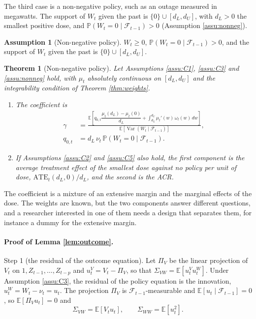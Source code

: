 \documentclass[12pt,a4paper]{article}
\newtheorem{thm}{Theorem}
\theoremstyle{definition}
\newtheorem{assumption}{Assumption}
\newcommand{\E}{\mathbb{E}}
\newcommand{\var}{\operatorname{Var}}
\begin{document}
The third case is a non-negative policy, such as an outage measured in megawatts. The support of $W_t$ given the past is $\{0\}\cup[d_L,d_U]$, with $d_L>0$ the smallest positive dose, and $\mathbb{P}(W_t=0\mid\mathcal{F}_{t-1})>0$ (Assumption \ref{assu:nonneg}).

\begin{assumption}[Non-negative policy\label{assu:nonneg}]
$W_t\geq0$, $\mathbb{P}(W_t=0\mid\mathcal{F}_{t-1})>0$, and the support of $W_t$ given the past is $\{0\}\cup[d_L,d_U]$.
\end{assumption}

\begin{thm}[Non-negative policy\label{thm:nonneg}]
Let Assumptions \ref{assu:C1}, \ref{assu:C3} and \ref{assu:nonneg} hold, with $\mu_t$ absolutely continuous on $[d_L,d_U]$ and the integrability condition of Theorem \ref{thm:weights}.
\begin{enumerate}
\item[(a)] The coefficient is
\begin{equation}
\begin{aligned}
\gamma&=\frac{\E\left[q_{0,t}\dfrac{\mu_t(d_L)-\mu_t(0)}{d_L}+\displaystyle\int_{d_L}^{d_U}\mu_t'(w)\,\omega_t(w)\,dw\right]}{\E[\var(W_t\mid\mathcal{F}_{t-1})]},\\
q_{0,t}&=d_L\,\nu_t\,\mathbb{P}(W_t=0\mid\mathcal{F}_{t-1}).
\end{aligned}
\label{eq:nonneg-a}
\end{equation}
\item[(b)] If Assumptions \ref{assu:C2} and \ref{assu:C5} also hold, the first component is the average treatment effect of the smallest dose against no policy per unit of dose, $\mathrm{ATE}_t(d_L,0)/d_L$, and the second is the ACR.
\end{enumerate}
\end{thm}

The coefficient is a mixture of an extensive margin and the marginal effects of the dose. The weights are known, but the two components answer different questions, and a researcher interested in one of them needs a design that separates them, for instance a dummy for the extensive margin.

\paragraph{Proof of Lemma \ref{lem:outcome}.} Step 1 (the residual of the outcome equation). Let $\Pi_V$ be the linear projection of $V_t$ on $1,Z_{t-1},\dots,Z_{t-p}$ and $u_t^V=V_t-\Pi_V$, so that $\Sigma_{VW}=\E[u_t^Vu_t^W]$. Under Assumption \ref{assu:C3}, the residual of the policy equation is the innovation, $u_t^W=W_t-\nu_t=u_t$. The projection $\Pi_V$ is $\mathcal{F}_{t-1}$-measurable and $\E[u_t\mid\mathcal{F}_{t-1}]=0$, so $\E[\Pi_Vu_t]=0$ and
\[
\Sigma_{VW}=\E[V_tu_t],\qquad \Sigma_{WW}=\E[u_t^2].
\]
\end{document}
